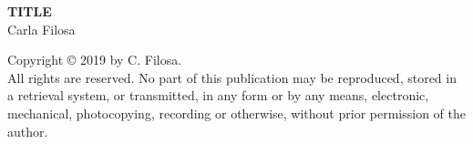 
\thispagestyle{plain}

\vspace*{4cm}

\begin{center}
{\Huge \textbf{TITLE}}\\
\vspace{1cm}
{\huge{Carla Filosa}}
\end{center}



\clearpage
\thispagestyle{plain}

\vspace*{\fill}






\vspace{1cm}

\noindent Copyright \copyright{} 2019 by C. Filosa. \\
All rights are reserved. No part of this publication may be reproduced, stored in a retrieval system, or transmitted, in any form or by any means, electronic, mechanical, photocopying, recording or otherwise, without prior permission of the author.

\clearpage


\thispagestyle{plain}


